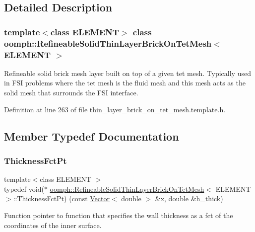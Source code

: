 \subsection{Detailed Description}
\subsubsection*{template$<$class E\+L\+E\+M\+E\+NT$>$\newline
class oomph\+::\+Refineable\+Solid\+Thin\+Layer\+Brick\+On\+Tet\+Mesh$<$ E\+L\+E\+M\+E\+N\+T $>$}

Refineable solid brick mesh layer built on top of a given tet mesh. Typically used in F\+SI problems where the tet mesh is the fluid mesh and this mesh acts as the solid mesh that surrounds the F\+SI interface. 

Definition at line 263 of file thin\+\_\+layer\+\_\+brick\+\_\+on\+\_\+tet\+\_\+mesh.\+template.\+h.



\subsection{Member Typedef Documentation}
\mbox{\label{classoomph_1_1RefineableSolidThinLayerBrickOnTetMesh_a45af8cb1926cec40d597eb18b75b96da}} 
\subsubsection{\texorpdfstring{Thickness\+Fct\+Pt}{ThicknessFctPt}}
{\footnotesize\ttfamily template$<$class E\+L\+E\+M\+E\+NT $>$ \\
typedef void($\ast$ \hyperlink{classoomph_1_1RefineableSolidThinLayerBrickOnTetMesh}{oomph\+::\+Refineable\+Solid\+Thin\+Layer\+Brick\+On\+Tet\+Mesh}$<$ E\+L\+E\+M\+E\+NT $>$\+::Thickness\+Fct\+Pt) (const \hyperlink{classoomph_1_1Vector}{Vector}$<$ double $>$ \&x, double \&h\+\_\+thick)}



Function pointer to function that specifies the wall thickness as a fct of the coordinates of the inner surface. 



